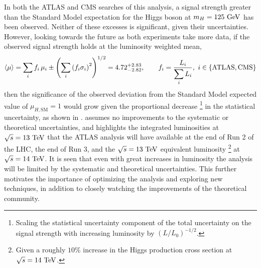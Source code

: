 In both the ATLAS and CMS searches of this analysis, a signal strength greater than the Standard Model expectation for the Higgs boson at $m_{H} = 125~\mathrm{GeV}$ has been observed.
Neither of these excesses is significant, given their uncertainties.
However, looking towards the future as both experiments take more data, if the observed signal strength holds at the luminosity weighted mean,
\[
 \braket{\mu} = \sum_{i} f_{i}\,\mu_{i} \pm \left(\sum_{i} \left(f_{i}\sigma_{i}\right)^{2}\right)^{1/2} = 4.72_{-2.82}^{+2.83}, \qquad f_{i} = \frac{L_{i}}{\displaystyle\sum_{i}L_{i}},~i \in \left\{\textrm{ATLAS}, \textrm{CMS}\right\}
\]
then the significance of the observed deviation from the Standard Model expected value of $\mu_{H, \textrm{SM}}=1$ would grow given the proportional decrease%
\footnote{Scaling the statistical uncertainty component of the total uncertainty on the signal strength with increasing luminosity by $\left(L/L_{0}\right)^{-1/2}$.}
in the statistical uncertainty, as shown in .
 assumes no improvements to the systematic or theoretical uncertainties, and highlights the integrated luminosities at $\sqrt{s}=13~\mathrm{TeV}$ that the ATLAS analysis will have available at the end of Run 2 of the LHC, the end of Run 3, and the $\sqrt{s}=13~\mathrm{TeV}$ equivalent luminosity%
\footnote{Given a roughly $10\%$ increase in the Higgs production cross section at $\sqrt{s}=14~\mathrm{TeV}$.}
at $\sqrt{s}=14~\mathrm{TeV}$.
It is seen that even with great increases in luminosity the analysis will be limited by the systematic and theoretical uncertainties.
This further motivates the importance of optimizing the analysis and exploring new techniques, in addition to closely watching the improvements of the theoretical community.


